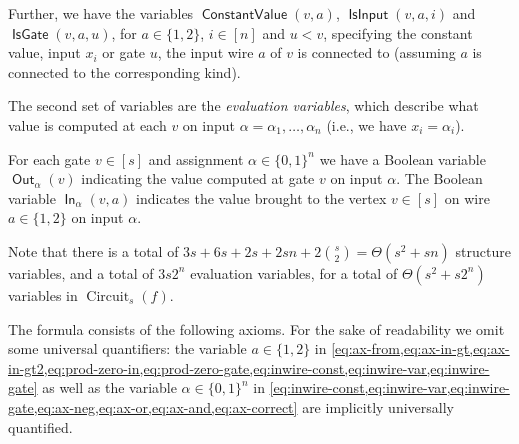 \documentclass[10pt,a4paper]{article}
\theoremstyle{plain}
\theoremstyle{remark}
\theoremstyle{definition}
\newcommand{\set}[1]{\{#1\}}
\newcommand{\vars}[1]{\mathsf{#1}}
\DeclareMathOperator{\circuit}{Circuit}
\DeclareMathOperator{\outwire}{\vars{Out}}
\DeclareMathOperator{\inwire}{\vars{In}}
\DeclareMathOperator{\constval}{\vars{ConstantValue}}
\DeclareMathOperator{\isvar}{\vars{IsInput}}
\DeclareMathOperator{\isgate}{\vars{IsGate}}
\begin{document}
Further, we have the variables $\constval(v, a)$, $\isvar(v, a, i)$
and $\isgate(v, a, u)$, for $a \in \set{1,2}$, $i \in [n]$ and
$u < v$, specifying the constant value, input $x_i$ or gate $u$, the
input wire $a$ of $v$ is connected to (assuming $a$ is connected to
the corresponding kind).

The second set of variables are the \emph{evaluation variables}, which
describe what value is computed at each $v$ on input
$\alpha = \alpha_1, \ldots, \alpha_n$ (i.e., we have $x_i = \alpha_i$).

For each gate $v \in [s]$ and assignment $\alpha \in \set{0,1}^n$ we
have a Boolean variable $\outwire_\alpha(v)$ indicating the value
computed at gate $v$ on input $\alpha$. The Boolean variable
$\inwire_{\alpha}(v, a)$ indicates the value brought to the vertex
$v \in [s]$ on wire $a \in \set{1,2}$ on input $\alpha$.

Note that there is a total of
$3s + 6s + 2s + 2sn + 2{s \choose 2} = \Theta(s^2+sn)$ structure
variables, and a total of $3 s 2^n$ evaluation variables, for a total
of $\Theta(s^2 + s 2^n)$ variables in $\circuit_s(f)$.

The formula consists of the following axioms. For the sake of
readability we omit some universal quantifiers: the variable
$a \in \set{1,2}$ in
\cref{eq:ax-from,eq:ax-in-gt,eq:ax-in-gt2,eq:prod-zero-in,eq:prod-zero-gate,eq:inwire-const,eq:inwire-var,eq:inwire-gate}
as well as the variable $\alpha \in \set{0,1}^n$ in
\cref{eq:inwire-const,eq:inwire-var,eq:inwire-gate,eq:ax-neg,eq:ax-or,eq:ax-and,eq:ax-correct}
are implicitly universally quantified.
\end{document}
